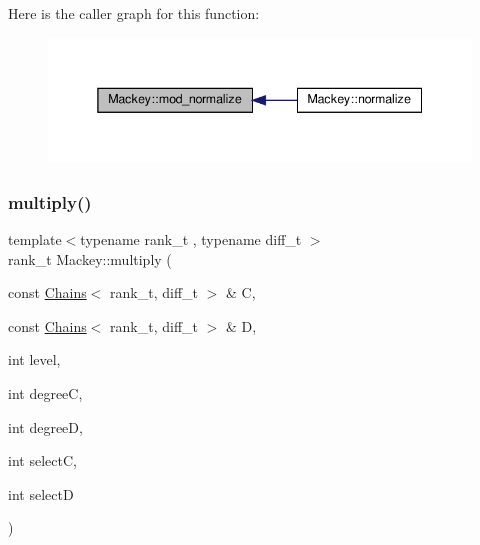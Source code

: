 Here is the caller graph for this function\+:\nopagebreak
\begin{figure}[H]
\begin{center}
\leavevmode
\includegraphics[width=338pt]{namespaceMackey_a257bcf5aabab2d73fdb13a23cb975d93_icgraph}
\end{center}
\end{figure}
\mbox{\label{namespaceMackey_a80dbde3a859378ede596b48869ec50d9}} 
\subsubsection{\texorpdfstring{multiply()}{multiply()}\hspace{0.1cm}{\footnotesize\ttfamily [1/2]}}
{\footnotesize\ttfamily template$<$typename rank\+\_\+t , typename diff\+\_\+t $>$ \\
rank\+\_\+t Mackey\+::multiply (\begin{DoxyParamCaption}\item[{const \hyperlink{classMackey_1_1Chains}{Chains}$<$ rank\+\_\+t, diff\+\_\+t $>$ \&}]{C,  }\item[{const \hyperlink{classMackey_1_1Chains}{Chains}$<$ rank\+\_\+t, diff\+\_\+t $>$ \&}]{D,  }\item[{int}]{level,  }\item[{int}]{degreeC,  }\item[{int}]{degreeD,  }\item[{int}]{selectC,  }\item[{int}]{selectD }\end{DoxyParamCaption})}

